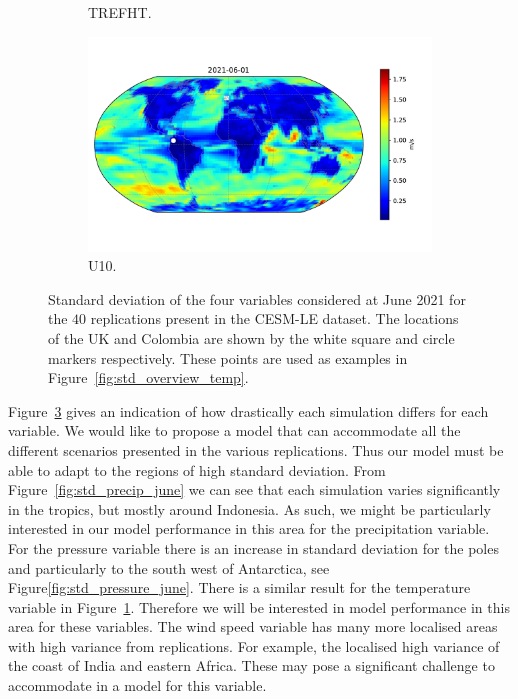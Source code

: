 \begin{figure}[htbp!]
\begin{subfigure}[b]{0.45\textwidth}
		\caption{TREFHT.}
		\label{fig:std_temp_june}   
	\end{subfigure}             
	\begin{subfigure}[b]{0.45\textwidth}
		\includegraphics[width=\textwidth]{U10_std}
		\caption{U10.}
		\label{fig:std_wind_june}
	\end{subfigure}             
	\caption[Spatial overview of the variability of Precipitation, Pressure, Temperature, and Wind speed from the CESM-LE dataset.]{ Standard deviation of the four variables considered at June 2021 for the $40$ replications present in the CESM-LE dataset. The locations of the UK and Colombia are shown by the white square and circle markers respectively. These points are used as examples in Figure~\ref{fig:std_overview_temp}. }
	\label{fig:std_overview}
\end{figure}

Figure~\ref{fig:std_overview} gives an indication of how drastically each simulation differs for each variable.
We would like to propose a model that can accommodate all the different scenarios presented in the various replications. 
Thus our model must be able to adapt to the regions of high standard deviation. 
From Figure~\ref{fig:std_precip_june} we can see that each simulation varies significantly in the tropics, but mostly around Indonesia.
As such, we might be particularly interested in our model performance in this area for the precipitation variable.
For the pressure variable there is an increase in standard deviation for the poles and particularly to the south west of Antarctica, see Figure\ref{fig:std_pressure_june}.
There is a similar result for the temperature variable in Figure~\ref{fig:std_temp_june}.
Therefore we will be interested in model performance in this area for these variables.
The wind speed variable has many more localised areas with high variance from replications.
For example, the localised high variance of the coast of India and eastern Africa.  
These may pose a significant challenge to accommodate in a model for this variable.

